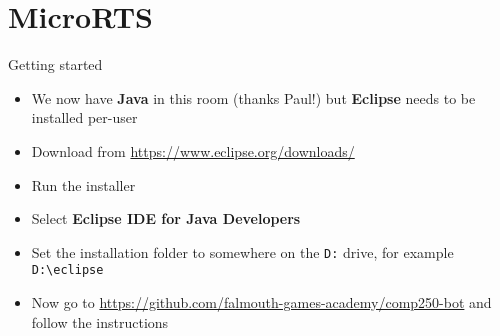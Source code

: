 \part{MicroRTS}
\frame{\partpage}

\begin{frame}[fragile]{Getting started}
    \begin{itemize}
        \item We now have \textbf{Java} in this room (thanks Paul!) but \textbf{Eclipse} needs to be installed per-user
        \item Download from \url{https://www.eclipse.org/downloads/}
        \item Run the installer
        \item Select \textbf{Eclipse IDE for Java Developers}
        \item Set the installation folder to somewhere on the \texttt{D:} drive,
            for example \verb!D:\eclipse!
        \item Now go to \url{https://github.com/falmouth-games-academy/comp250-bot} and follow the instructions
    \end{itemize}
\end{frame}
